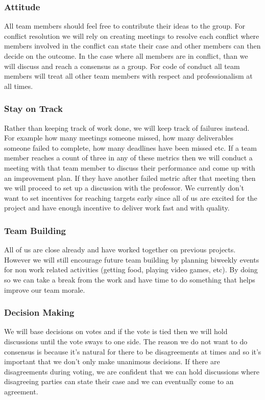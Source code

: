 \documentclass{article}
\begin{document}
\subsubsection*{Attitude}


All team members should feel free to contribute their ideas to the group. For conflict resolution we will rely on creating meetings to resolve each conflict where members involved in the conflict can state their case and other members can then decide on the outcome. In the case where all members are in conflict, than we will discuss and reach a consensus as a group. For code of conduct all team members will treat all other team members with respect and professionalism at all times.

\subsubsection*{Stay on Track}

Rather than keeping track of work done, we will keep track of failures instead. For example how many meetings someone missed, how many deliverables someone failed to complete, how many deadlines have been missed etc. If a team member reaches a count of three in any of these metrics then we will conduct a meeting with that team member to discuss their performance and come up with an improvement plan. If they have another failed metric after that meeting then we will proceed to set up a discussion with the professor. We currently don't want to set incentives for reaching targets early since all of us are excited for the project and have enough incentive to deliver work fast and with quality. 

\subsubsection*{Team Building}
All of us are close already and have worked together on previous projects. However we will still encourage future team building by planning biweekly events for non work related activities (getting food, playing video games, etc). By doing so we can take a break from the work and have time to do something that helps improve our team morale. 

\subsubsection*{Decision Making} 

We will base decisions on votes and if the vote is tied then we will hold discussions until the vote sways to one side. The reason we do not want to do consensus is because it's natural for there to be disagreements at times and so it's important that we don't only make unanimous decisions. If there are disagreements during voting, we are confident that we can hold discussions where disagreeing parties can state their case and we can eventually come to an agreement.
\end{document}
